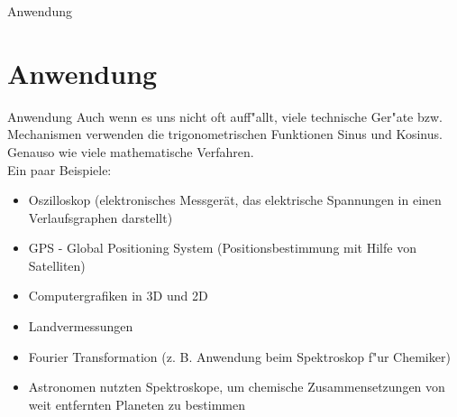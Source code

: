 \documentclass{standalone}
\begin{document}
\begin{frame}
  \begin{center}
    Anwendung
  \end{center}
  \section{Anwendung}
\end{frame}

\begin{frame}{Anwendung}
  \vspace{-\topsep}
  Auch wenn es uns nicht oft auff{"a}llt, viele technische Ger{"a}te bzw. Mechanismen verwenden die trigonometrischen Funktionen Sinus und Kosinus. Genauso wie viele mathematische Verfahren.\\
  \noindent Ein paar Beispiele:

  \begin{itemize}
    \setlength{\parskip}{0pt}
    \setlength{\itemsep}{0pt plus 1pt}
    \item<2-> Oszilloskop (elektronisches Messgerät, das elektrische Spannungen in einen Verlaufsgraphen darstellt) 
    \item<3-> GPS - Global Positioning System (Positionsbestimmung mit Hilfe von Satelliten)
    \item<4-> Computergrafiken in 3D und 2D
    \item<5-> Landvermessungen
    \item<6-> Fourier Transformation (z. B. Anwendung beim Spektroskop f{"u}r Chemiker)
    \item<7-> Astronomen nutzten Spektroskope, um chemische Zusammensetzungen von weit entfernten Planeten zu bestimmen
  \end{itemize}
\end{frame}
\end{document}
